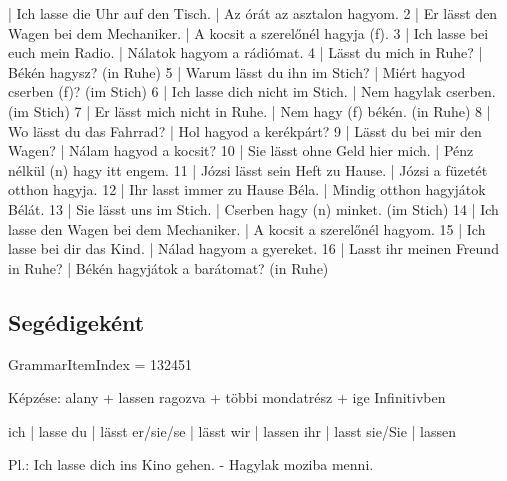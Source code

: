 \documentclass{article}
\newenvironment{desc}{\verbatim}{\endverbatim}
\newenvironment{exmp}{\verbatim}{\endverbatim}
\begin{document}
\begin{exmp}
1 | Ich lasse die Uhr auf den Tisch. | Az órát az asztalon hagyom.
2 | Er lässt den Wagen bei dem Mechaniker. | A kocsit a szerelőnél hagyja (f).
3 | Ich lasse bei euch mein Radio. | Nálatok hagyom a rádiómat.
4 | Lässt du mich in Ruhe? | Békén hagysz? (in Ruhe)
5 | Warum lässt du ihn im Stich? | Miért hagyod cserben (f)? (im Stich)
6 | Ich lasse dich nicht im Stich. | Nem hagylak cserben. (im Stich)
7 | Er lässt mich nicht in Ruhe. | Nem hagy (f) békén. (in Ruhe)
8 | Wo lässt du das Fahrrad? | Hol hagyod a kerékpárt?
9 | Lässt du bei mir den Wagen? | Nálam hagyod a kocsit?
10 | Sie lässt ohne Geld hier mich. | Pénz nélkül (n) hagy itt engem.
11 | Józsi lässt sein Heft zu Hause. | Józsi a füzetét otthon hagyja.
12 | Ihr lasst immer zu Hause Béla. | Mindig otthon hagyjátok Bélát.
13 | Sie lässt uns im Stich. | Cserben hagy (n) minket. (im Stich)
14 | Ich lasse den Wagen bei dem Mechaniker. | A kocsit a szerelőnél hagyom.
15 | Ich lasse bei dir das Kind. | Nálad hagyom a gyereket.
16 | Lasst ihr meinen Freund in Ruhe? | Békén hagyjátok a barátomat? (in Ruhe)
\end{exmp}

\subsection{Segédigeként}

GrammarItemIndex = 132451

\begin{desc}
Képzése:
alany + lassen ragozva + többi mondatrész + ige Infinitivben

ich       | lasse
du        | lässt
er/sie/se | lässt
wir       | lassen
ihr       | lasst
sie/Sie   | lassen

Pl.: Ich lasse dich ins Kino gehen. - Hagylak moziba menni.
\end{desc}
\end{document}
